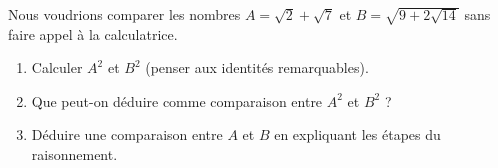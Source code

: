 
\begin{exercice}\label{exosmath-0141}

    Nous voudrions comparer les nombres \( A=\sqrt{2}+\sqrt{7}\) et \( B=\sqrt{9+2\sqrt{14}}\) sans faire appel à la calculatrice.
    \begin{enumerate}
        \item
            Calculer \( A^2\) et \( B^2\) (penser aux identités remarquables).
        \item
            Que peut-on déduire comme comparaison entre \( A^2\) et \( B^2\) ?
        \item
            Déduire une comparaison entre \( A\) et \( B\) en expliquant les étapes du raisonnement.
    \end{enumerate}

\end{exercice}
